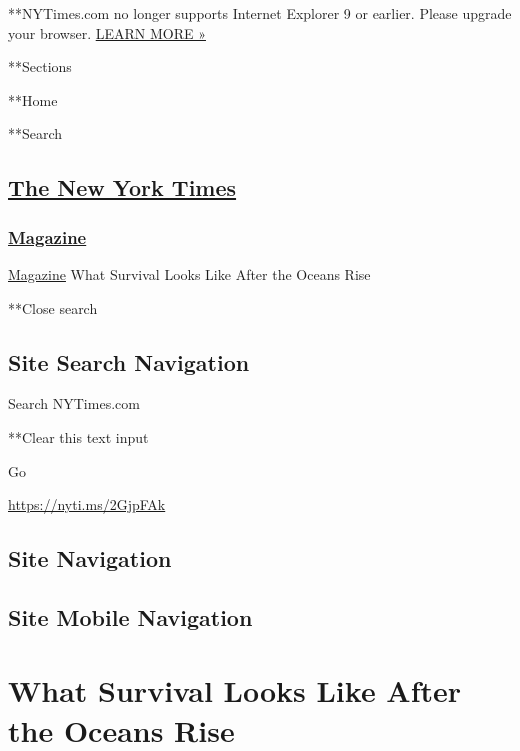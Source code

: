  **NYTimes.com no longer supports Internet Explorer 9 or earlier. Please
upgrade your browser.
\href{http://www.nytimes3xbfgragh.onion/content/help/site/ie9-support.html}{LEARN
MORE »}

**Sections

**Home

**Search

\hypertarget{the-new-york-times}{%
\subsection{\texorpdfstring{\href{http://www.nytimes3xbfgragh.onion/}{The
New York Times}}{The New York Times}}\label{the-new-york-times}}

\hypertarget{-magazine-}{%
\subsubsection{\texorpdfstring{
\href{https://www.nytimes3xbfgragh.onion/section/magazine}{Magazine}
}{ Magazine }}\label{-magazine-}}

 \href{https://www.nytimes3xbfgragh.onion/section/magazine}{Magazine}
\textbar{}What Survival Looks Like After the Oceans Rise

**Close search

\hypertarget{site-search-navigation}{%
\subsection{Site Search Navigation}\label{site-search-navigation}}

Search NYTimes.com

**Clear this text input

Go

\url{https://nyti.ms/2GjpFAk}

\hypertarget{site-navigation}{%
\subsection{Site Navigation}\label{site-navigation}}

\hypertarget{site-mobile-navigation}{%
\subsection{Site Mobile Navigation}\label{site-mobile-navigation}}

\hypertarget{what-survival-looks-like-after-the-oceans-rise}{%
\section{What Survival Looks Like After the Oceans
Rise}\label{what-survival-looks-like-after-the-oceans-rise}}

